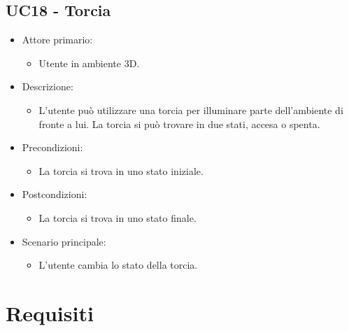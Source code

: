 \subsection{UC18 - Torcia}
\begin{itemize}

	\item Attore primario: 
	\begin{itemize}
		\item Utente in ambiente 3D.
	\end{itemize}
	\item Descrizione:
	\begin{itemize}
		\item L'utente può utilizzare una torcia per illuminare parte dell'ambiente di fronte a lui. \newline La torcia si può trovare in due stati, accesa o spenta.
	\end{itemize}
	
	\item Precondizioni:
	\begin{itemize}
		\item La torcia si trova in uno stato iniziale.
	\end{itemize}
	
	\item Postcondizioni:
	\begin{itemize}
		\item La torcia si trova in uno stato finale.
	\end{itemize}
	
	\item Scenario principale:
	\begin{itemize}
		\item L'utente cambia lo stato della torcia.
	\end{itemize}
	
\end{itemize}

\pagebreak


\section{Requisiti}

